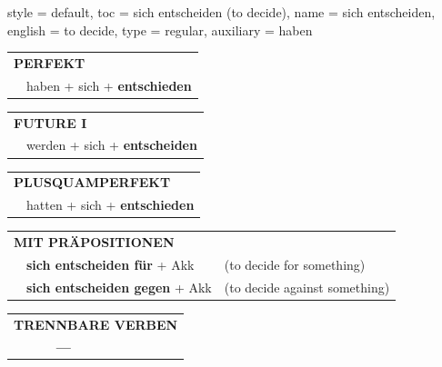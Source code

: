 \begin{verbentry}{
  style = {default},
  toc = {sich entscheiden (to decide)},
  name = {sich entscheiden},
  english = {to decide},
  type = {regular},
  auxiliary = {haben}
}
 \begin{tabular}{rl}
     \multicolumn{2}{l}{\textbf{PERFEKT}}\\
    &haben + sich + \textbf{entschieden}\\
  \end{tabular}
\hfill
   \begin{tabular}{rl}
   
    \multicolumn{2}{l}{\textbf{FUTURE I} }\\
    &werden + sich + \textbf{entscheiden}\\
 
  \end{tabular}
\hfill
   \begin{tabular}{rl}
      \multicolumn{2}{l}{\textbf{PLUSQUAMPERFEKT}}\\
    &hatten + sich + \textbf{entschieden}\\
  \end{tabular}
  
\vspace{10pt}

   \begin{tabular}{lll}
      \multicolumn{3}{l}{\textbf{MIT PRÄPOSITIONEN}}\\
& \textbf{sich entscheiden für} + Akk & (to decide for something)\\
& \textbf{sich entscheiden gegen} + Akk & (to decide against something)
  \end{tabular}
  \hfill
   \begin{tabular}{lll}
\multicolumn{3}{l}{\textbf{TRENNBARE VERBEN}}\\
& \textbf{---} & \\
\end{tabular}
  
  \vspace{-5pt}
\end{verbentry}


